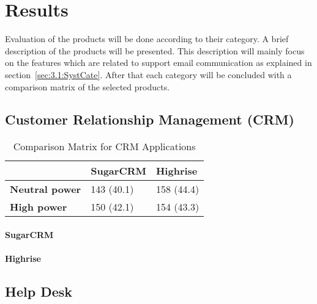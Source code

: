 \section{Results}
\label{sec:3.3:Resul}
Evaluation of the products will be done according to their category. A brief description of the products will be presented. This description will mainly focus on the features which are related to support email communication as explained in section~\ref{sec:3.1:SystCate}. After that each category will be concluded with a comparison matrix of the selected products.

\subsection{Customer Relationship Management (CRM)}
\label{subsec:3.3.1:Cust}

\begin{table}[!ht]
\begin{center}
	\caption[Comparison Matrix for CRM Applications]{Comparison Matrix for CRM Applications} \label{tab:comp_matr_crm}
    \begin{tabular}{ p{3cm} p{3cm}  p{3cm} }
	\hline
	& \textbf{SugarCRM} & \textbf{Highrise} \\ \hline
	\textbf{Neutral power} & 143 (40.1) & 158 (44.4) \\
	\textbf{High power} & 150 (42.1) & 154 (43.3) \\ \hline
    \end{tabular}
\end{center}
\end{table}

\paragraph{SugarCRM}

\paragraph{Highrise}


\subsection{Help Desk}
\label{subsec:3.3.2:HelpDeskSoft}


